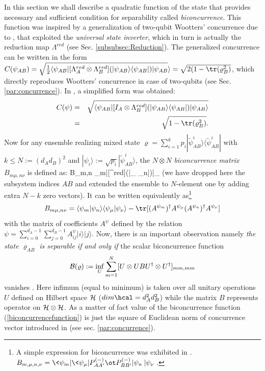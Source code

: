\documentclass[twocolumn,aps,rmp]{revtex4}
\begin{document}
In this section we shall describe a quadratic function of the state
that provides necessary and sufficient condition for separability
called {\it biconcurrence}. This function was inspired by a
generalization of two-qubit Wootters' concurrence due to
\cite{RungtaBCHM2001-concurrence}, that exploited the {\it universal
  state inverter}, which in turn is actually the reduction map
$\Lambda^{red}$ (see Sec. \ref{subsubsec:Reduction}). The generalized
concurrence can be written in the form $C(\psi_{AB})= \sqrt{{1\over 2}\langle
\psi_{AB}|[\Lambda^{red}_{A} \otimes
\Lambda^{red}_{B}](|\psi_{AB}\rangle \langle \psi_{AB}|)|\psi_{AB}}
\rangle=\sqrt{2(1-{\tr}(\varrho_{B}^{2})}$, which directly reproduces
Wootters' concurrence in case of two-qubits (see Sec. \ref{par:concurrence}). In
\cite{BadziagDHHH01-conc}, a simplified form was obtained:
\begin{eqnarray}
C(\psi)&=&\sqrt{\langle \psi_{AB}|[I_{A} \otimes
\Lambda^{red}_{B}](|\psi_{AB}\rangle \langle \psi_{AB}|)|\psi_{AB}
\rangle }\nonumber\\
&=&\sqrt{1-{\tr}(\varrho_{B}^{2})}.
\end{eqnarray}
Now for any ensemble realizing mixed state $\varrho=\sum_{i=1}^{k}
p_{i}|\tilde{\psi}_{AB}^{i}\rangle \langle \tilde{\psi}_{AB}^{i}|$
with $k \leq N:=(d_{A}d_{B})^{2}$ and
$|\psi_{i}\rangle:=\sqrt{p_{i}}|\tilde{\psi}_{AB}^{i}\rangle $, the
$N \otimes N$ {\it biconcurrence matrix} $B_{m\mu,n\nu}$ is defined as:
\be
B_{m\mu,n\nu} \equiv \langle
\psi_{m}|[\id \otimes \Lambda^{red}](|\psi_{\mu}\rangle \langle
\psi_{n}|)|\psi_{\nu} \rangle
\label{biconcurrencematrix}
\ee
(we have dropped here the subsystem indices $AB$ and extended the
ensemble to $N$-element one by adding extra $N-k$ zero vectors). It
can be written equivalently as\footnote{A simple expression for biconcurrence was
  exhibited in \cite{MintertKB04-conc}.
  $B_{m,\mu,n,\nu}=\<\psi_m|\<\psi_\mu| P^{(-)}_{AA'}\ot P^{(-)}_{BB'}
  |\psi_n\>|\psi_\nu\>$.}
\begin{equation}
B_{m \mu,n \nu}=\langle \psi_m|\psi_n \rangle
\langle\psi_\mu|\psi_\nu \rangle -
 {\tr}[(A^{\psi_{m}})^{\dagger}A^{\psi_{\mu}}
(A^{\psi_{n}})^{\dagger}A^{\psi_{\nu}}]
\label{eq:bicon-latwe}
\end{equation}
with the matrix of coefficients $A^{\psi}$ defined by the relation
$\psi=\sum_{i=0}^{d_{A}-1}\sum_{j=0}^{d_{B}-1}
A^{\psi}_{ij}|i\rangle|j\rangle $. Now, there is an important
observation namely {\it the state $\varrho_{AB}$ is separable if and
only if} the scalar biconcurrence function
\begin{equation}
{\cal B}(\varrho):=\inf_{U} \sum_{m=1}^N[U \otimes U B U^{\dagger}
\otimes U^{\dagger}]_{mm,mm} \label{biconcurrencefunction}
\end{equation}
vanishes \cite{BadziagDHHH01-conc}. Here infimum (equal to minimum) is
taken over all unitary operations $U$ defined on Hilbert space ${\cal
  H}$ ($dim \hcal = d_{A}^{2}d_{B}^{2}$) while the matrix $B$
represents operator on ${\cal H} \otimes {\cal H}$.
As a matter of fact value of the biconcurrence function
(\ref{biconcurrencefunction}) is just the
square of Euclidean norm of concurrence vector introduced  in
\cite{AudenaertVM2000-concurrence} (see sec. \ref{par:concurrence}).
\end{document}
